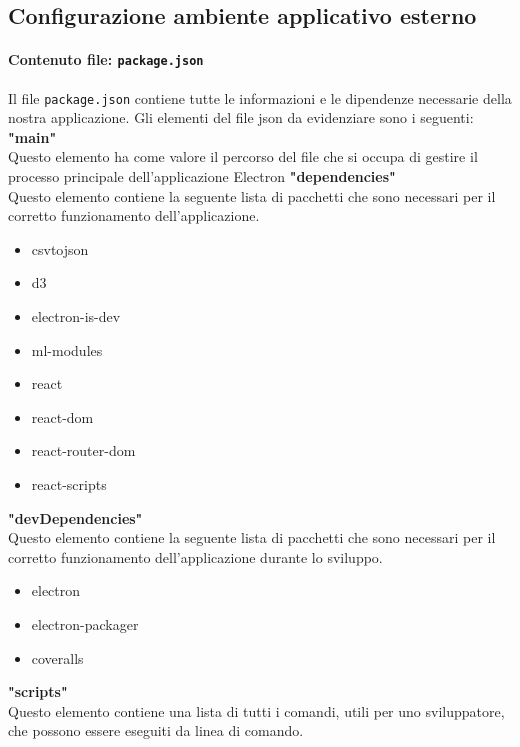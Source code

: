 \subsection{Configurazione ambiente applicativo esterno}
\paragraph{Contenuto file: \verb|package.json|}
Il file \verb|package.json| contiene tutte le informazioni e le dipendenze necessarie della nostra applicazione. Gli elementi del file json da evidenziare sono i seguenti:
\textbf{"main"} \\
Questo elemento ha come valore il percorso del file che si occupa di gestire il processo principale dell'applicazione Electron
\textbf{"dependencies"} \\
Questo elemento contiene la seguente lista di pacchetti che sono necessari per il corretto funzionamento dell'applicazione.
\begin{itemize}
    \item csvtojson
    \item d3
    \item electron-is-dev
    \item ml-modules
    \item react
    \item react-dom
    \item react-router-dom
    \item react-scripts
\end{itemize}
\textbf{"devDependencies"} \\
Questo elemento contiene la seguente lista di pacchetti che sono necessari per il corretto funzionamento dell'applicazione durante lo sviluppo.
\begin{itemize}
    \item electron
    \item electron-packager
    \item coveralls
\end{itemize}
\textbf{"scripts"} \\
Questo elemento contiene una lista di tutti i comandi, utili per uno sviluppatore, che possono essere eseguiti da linea di comando.
